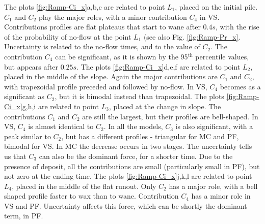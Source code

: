 \documentclass{article}
\begin{document}
The plots \ref{fig:Ramp-Ci_x}a,b,c are related to point $L_1$, placed on the initial pile. $C_1$ and $C_2$ play the major roles, with a minor contribution $C_4$ in VS. Contributions profiles are flat plateaus that start to wane after $0.4 s$, with the rise of the probability of no-flow at the point $L_1$ (see also Fig. \ref{fig:Ramp-Pr_x}. Uncertainty is related to the no-flow times, and to the value of $C_2$. The contribution $C_4$ can be significant, as it is shown by the 95$^{\mathrm{th}}$ percentile values, but appears after $0.25 s$. The plots \ref{fig:Ramp-Ci_x}d,e,f are related to point $L_2$, placed in the middle of the slope. Again the major contributions are $C_1$ and $C_2$, with trapezoidal profile preceded and followed by no-flow. In VS, $C_4$ becomes as a significant as $C_2$, but it is bimodal instead than trapezoidal. The plots \ref{fig:Ramp-Ci_x}g,h,i are related to point $L_3$, placed at the change in slope. The contributions $C_1$ and $C_2$ are still the largest, but their profiles are bell-shaped. In VS, $C_4$ is almost identical to $C_2$. In all the models, $C_3$ is also significant, with a peak similar to $C_2$, but has a different profiles - triangular for MC and PF, bimodal for VS. In MC the decrease occurs in two stages. The uncertainty tells us that $C_3$ can also be the dominant force, for a shorter time. Due to the presence of deposit, all the contributions are small (particularly small in PF), but not zero at the ending time. The plots \ref{fig:Ramp-Ci_x}j,k,l are related to point $L_4$, placed in the middle of the flat runout. Only $C_2$ has a major role, with a bell shaped profile faster to wax than to wane. Contribution $C_4$ has a minor role in VS and PF. Uncertainty affects this force, which can be shortly the dominant term, in PF.

\newpage
\end{document}

